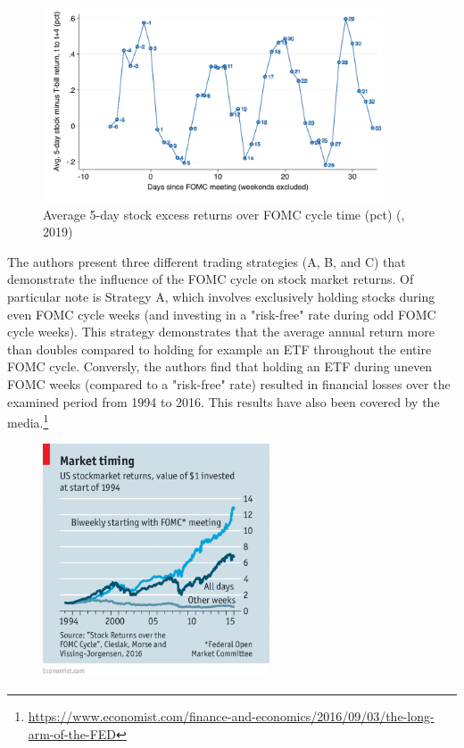 \begin{figure}[h]
    \centering
    \label{cies19_fig1}
    \includegraphics[width=0.9\textwidth]{figures/cies19/fig1}
    \caption{Average 5-day stock excess returns over FOMC cycle time (pct) (\cite{cieslak_stock_2019}, 2019) }
\end{figure}

The authors present three different trading strategies (A, B, and C) that demonstrate the influence of the FOMC cycle on stock market returns.  Of particular note is Strategy A, which involves exclusively holding stocks during even FOMC cycle weeks (and investing in a "risk-free" rate during odd FOMC cycle weeks). This strategy demonstrates that the average annual return more than doubles compared to holding for example an ETF throughout the entire FOMC cycle.  Conversly, the authors find that holding an ETF during uneven FOMC weeks (compared to a "risk-free" rate) resulted in financial losses over the examined period from 1994 to 2016.  This results have also been covered by the media.\footnote{\url{https://www.economist.com/finance-and-economics/2016/09/03/the-long-arm-of-the-FED}}

\begin{figure}[h]
    \centering
     \label{FED_long_arm}
    \includegraphics[width=0.6\textwidth]{figures/20160903_FNC453.png}
    \caption{\cite{noauthor_long_2016}}
\end{figure}

